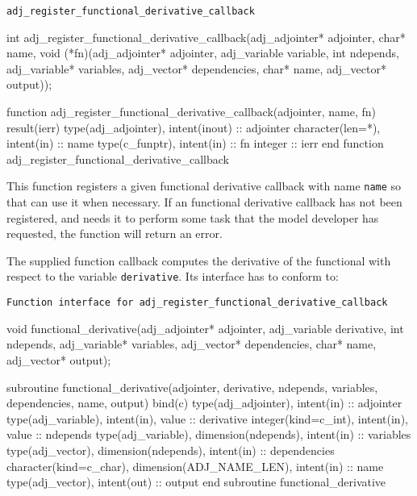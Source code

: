 \begin{boxwithtitle}{\texttt{adj_register_functional_derivative_callback}}
\begin{minipage}{\columnwidth}
\begin{ccode}
  int adj_register_functional_derivative_callback(adj_adjointer* adjointer, 
                      char* name, 
                      void (*fn)(adj_adjointer* adjointer, 
                                 adj_variable variable, int ndepends, 
                                 adj_variable* variables, adj_vector* dependencies, 
                                 char* name, adj_vector* output));
\end{ccode}
\begin{fortrancode}
  function adj_register_functional_derivative_callback(adjointer, name, fn) 
      result(ierr)
    type(adj_adjointer), intent(inout) :: adjointer
    character(len=*), intent(in) :: name
    type(c_funptr), intent(in) :: fn
    integer :: ierr
  end function adj_register_functional_derivative_callback
\end{fortrancode}
\end{minipage}
\end{boxwithtitle}
This function registers a given functional derivative callback with name \texttt{name} so that \libadjoint can use
it when necessary. 
If an functional derivative callback has not been registered, and \libadjoint needs it to perform some task that the model developer has
requested, the function will return an  error.

The supplied function callback computes the derivative of the functional with respect to the variable \texttt{derivative}. 
Its interface has to conform to:

\begin{boxwithtitle}{\texttt{Function interface for \texttt{adj_register_functional_derivative_callback}}}
\begin{minipage}{\columnwidth}
\begin{ccode}
  void functional_derivative(adj_adjointer* adjointer,
                                 adj_variable derivative, int ndepends, 
                                 adj_variable* variables, adj_vector* dependencies,
                                 char* name, adj_vector* output);
\end{ccode}
\begin{fortrancode}
  subroutine functional_derivative(adjointer, derivative, ndepends, variables, 
                                   dependencies, name, output)  bind(c)
    type(adj_adjointer), intent(in) :: adjointer
    type(adj_variable), intent(in), value :: derivative 
    integer(kind=c_int), intent(in), value :: ndepends
    type(adj_variable), dimension(ndepends), intent(in) :: variables
    type(adj_vector), dimension(ndepends), intent(in) :: dependencies
    character(kind=c_char), dimension(ADJ_NAME_LEN), intent(in) :: name
    type(adj_vector), intent(out) :: output
  end subroutine functional_derivative
\end{fortrancode}
\end{minipage}
\end{boxwithtitle}

